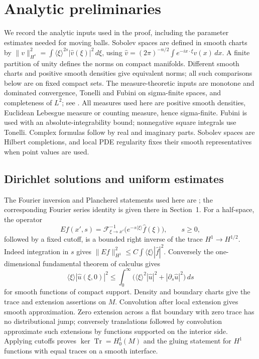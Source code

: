 \section{Analytic preliminaries}
\label{sec:prelim}
We record the analytic inputs used in the proof, including the parameter
estimates needed for moving balls. Sobolev spaces are defined in smooth
charts by $\|v\|_{H^s}^2=\int\langle\xi\rangle^{2s}|\widehat v(\xi)|^2\,d\xi$,
using $\widehat v=(2\pi)^{-n/2}\int e^{-ix\cdot\xi}v(x)\,dx$.
A finite partition of unity defines the norms on compact manifolds.
Different smooth charts and positive smooth densities give equivalent
norms; all such comparisons below are on fixed compact sets.
The measure-theoretic inputs are monotone and dominated convergence,
Tonelli and Fubini on sigma-finite spaces, and completeness of $L^2$;
see \citep[Theorems~3.11, 3.31, 5.28, 5.32 and~7.24]{Axler2020}.
All measures used here are positive smooth densities, Euclidean
Lebesgue measure or counting measure, hence sigma-finite. Fubini is
used with an absolute-integrability bound; nonnegative square integrals
use Tonelli. Complex formulas follow by real and imaginary parts.
Sobolev spaces are Hilbert completions, and local PDE regularity fixes
their smooth representatives when point values are used.

\subsection{Dirichlet solutions and uniform estimates}
The Fourier inversion and Plancherel statements used here are
\citep[Propositions~3.1--3.2]{TaylorFourier}; the corresponding Fourier
series identity is given there in Section~1.
For a half-space, the operator
\[
 Ef(x',s)=\mathcal F^{-1}_{\xi\to x'}
           \big(e^{-s\langle\xi\rangle}\widehat f(\xi)\big),\qquad s\ge0,
\]
followed by a fixed cutoff, is a bounded right inverse of the trace
$H^1\to H^{1/2}$. Indeed integration in $s$ gives
$\|Ef\|_{H^1}^2\le C\int\langle\xi\rangle|\widehat f|^2$.
Conversely the one-dimensional fundamental theorem of calculus gives
\[
 \langle\xi\rangle|\widehat u(\xi,0)|^2
 \le\int_0^\infty
       \big(\langle\xi\rangle^2|\widehat u|^2
                        +|\partial_s\widehat u|^2\big)\,ds
\]
for smooth functions of compact support. Density and boundary charts
give the trace and extension assertions on $M$. Convolution after
local extension gives smooth approximation. Zero extension across a
flat boundary with zero trace has no distributional jump; conversely
translations followed by convolution approximate such extensions by
functions supported on the interior side. Applying cutoffs proves
$\ker\operatorname{Tr}=H^1_0(M)$ and the gluing statement for $H^1$
functions with equal traces on a smooth interface.

